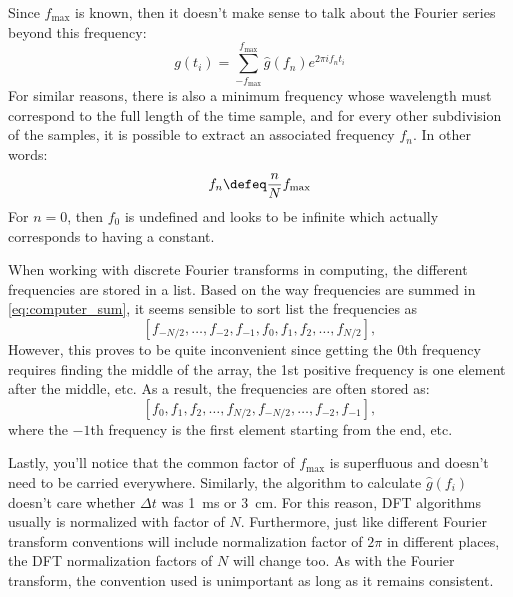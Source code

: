 \documentclass[
  a4paper,             %
  11pt,                %
  oneside,             %
  onecolumn,           %
  bibliography=totoc,  %
  final,               %
]{scrartcl}
\begin{document}
Since \(f_{\text{max}}\) is known, then it doesn't make sense to talk about the
Fourier series beyond this frequency:
\begin{equation}
  \label{eq:computer_sum}
  g(t_{i}) = \sum_{-f_{\text{max}}}^{f_{\text{max}}} \hat g(f_{n}) e^{2\pi i f_{n} t_{i}}
\end{equation}
For similar reasons, there is also a minimum frequency whose wavelength must
correspond to the full length of the time sample, and for every other
subdivision of the samples, it is possible to extract an associated frequency
\(f_{n}\).  In other words:
\begin{equation}
  f_{n} \defeq \frac{n}{N} f_{\text{max}}
\end{equation}
For \(n = 0\), then \(f_{0}\) is undefined and looks to be infinite which
actually corresponds to having a constant.

When working with discrete Fourier transforms in computing, the different
frequencies are stored in a list.  Based on the way frequencies are summed in
\cref{eq:computer_sum}, it seems sensible to sort list the frequencies as
\begin{equation}
  \left[
    f_{-N/2},
    \dots,
    f_{-2},
    f_{-1},
    f_{0},
    f_{1},
    f_{2},
    \dots,
    f_{N/2}
  \right],
\end{equation}
However, this proves to be quite inconvenient since getting the 0th frequency
requires finding the middle of the array, the 1st positive frequency is one
element after the middle, etc.  As a result, the frequencies are often stored
as:
\begin{equation}
  \left[
    f_{0},
    f_{1},
    f_{2},
    \dots,
    f_{N/2},
    f_{-N/2},
    \dots,
    f_{-2},
    f_{-1}
  \right],
\end{equation}
where the \(-1\)th frequency is the first element starting from the end, etc.

Lastly, you'll notice that the common factor of \(f_{\text{max}}\) is
superfluous and doesn't need to be carried everywhere.  Similarly, the algorithm
to calculate \(\hat g(f_{i})\) doesn't care whether \(\Delta t\) was
\SI{1}{\milli\second} or \SI{3}{\centi\metre}.  For this reason, \gls{DFT}
algorithms usually is normalized with factor of \(N\).  Furthermore, just like
different Fourier transform conventions will include normalization factor of
\(2\pi\) in different places, the \gls{DFT} normalization factors of \(N\) will
change too.  As with the Fourier transform, the convention used is unimportant
as long as it remains consistent.
\end{document}
